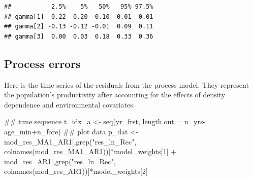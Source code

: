 \documentclass[
  11pt,
]{article}
\newenvironment{Shaded}{}{}
\newcommand{\CommentTok}[1]{\textcolor[rgb]{0.00,0.50,0.00}{#1}}
\newcommand{\DataTypeTok}[1]{#1}
\newcommand{\DecValTok}[1]{#1}
\newcommand{\KeywordTok}[1]{\textcolor[rgb]{0.00,0.00,1.00}{#1}}
\newcommand{\NormalTok}[1]{#1}
\newcommand{\OperatorTok}[1]{#1}
\newcommand{\StringTok}[1]{\textcolor[rgb]{0.00,0.50,0.50}{#1}}
\begin{document}
\begin{verbatim}
##           2.5%    5%   50%   95% 97.5%
## gamma[1] -0.22 -0.20 -0.10 -0.01  0.01
## gamma[2] -0.13 -0.12 -0.01  0.09  0.11
## gamma[3]  0.00  0.03  0.18  0.33  0.36
\end{verbatim}

\hypertarget{process-errors}{%
\subsection{Process errors}\label{process-errors}}

Here is the time series of the residuals from the process model. They
represent the population's productivity after accounting for the effects
of density dependence and environmental covariates.

\begin{Shaded}
\begin{Highlighting}[]
\CommentTok{## time sequence}
\NormalTok{t_idx_a <-}\StringTok{ }\KeywordTok{seq}\NormalTok{(yr_frst, }\DataTypeTok{length.out =}\NormalTok{ n_yrs}\OperatorTok{-}\NormalTok{age_min}\OperatorTok{+}\NormalTok{n_fore)}
\CommentTok{## plot data}
\NormalTok{p_dat <-}\StringTok{ }\NormalTok{mod_res_MA1_AR1[,}\KeywordTok{grep}\NormalTok{(}\StringTok{"res_ln_Rec"}\NormalTok{, }\KeywordTok{colnames}\NormalTok{(mod_res_MA1_AR1))]}\OperatorTok{*}\NormalTok{model_weights[}\DecValTok{1}\NormalTok{] }\OperatorTok{+}\StringTok{ }\NormalTok{mod_res_AR1[,}\KeywordTok{grep}\NormalTok{(}\StringTok{"res_ln_Rec"}\NormalTok{, }\KeywordTok{colnames}\NormalTok{(mod_res_AR1))]}\OperatorTok{*}\NormalTok{model_weights[}\DecValTok{2}\NormalTok{] }


\end{Highlighting}
\end{Shaded}
\end{document}
